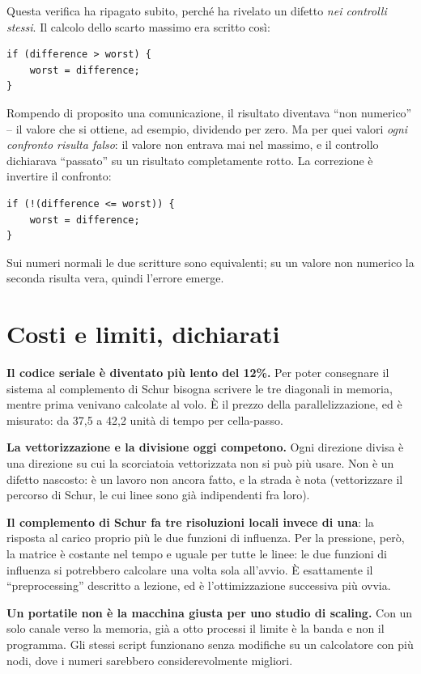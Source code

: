 \documentclass[11pt,a4paper]{article}
\begin{document}
Questa verifica ha ripagato subito, perché ha rivelato un difetto \emph{nei
controlli stessi}. Il calcolo dello scarto massimo era scritto così:

\begin{lstlisting}
if (difference > worst) {
    worst = difference;
}
\end{lstlisting}

Rompendo di proposito una comunicazione, il risultato diventava ``non
numerico'' -- il valore che si ottiene, ad esempio, dividendo per zero. Ma per
quei valori \emph{ogni confronto risulta falso}: il valore non entrava mai nel
massimo, e il controllo dichiarava ``passato'' su un risultato completamente
rotto. La correzione è invertire il confronto:

\begin{lstlisting}
if (!(difference <= worst)) {
    worst = difference;
}
\end{lstlisting}

Sui numeri normali le due scritture sono equivalenti; su un valore non numerico
la seconda risulta vera, quindi l'errore emerge.

\section{Costi e limiti, dichiarati}

\textbf{Il codice seriale è diventato più lento del 12\%.} Per poter consegnare
il sistema al complemento di Schur bisogna scrivere le tre diagonali in
memoria, mentre prima venivano calcolate al volo. È il prezzo della
parallelizzazione, ed è misurato: da 37{,}5 a 42{,}2 unità di tempo per
cella-passo.

\textbf{La vettorizzazione e la divisione oggi competono.} Ogni direzione
divisa è una direzione su cui la scorciatoia vettorizzata non si può più usare.
Non è un difetto nascosto: è un lavoro non ancora fatto, e la strada è nota
(vettorizzare il percorso di Schur, le cui linee sono già indipendenti fra
loro).

\textbf{Il complemento di Schur fa tre risoluzioni locali invece di una}: la
risposta al carico proprio più le due funzioni di influenza. Per la pressione,
però, la matrice è costante nel tempo e uguale per tutte le linee: le due
funzioni di influenza si potrebbero calcolare una volta sola all'avvio. È
esattamente il ``preprocessing'' descritto a lezione, ed è l'ottimizzazione
successiva più ovvia.

\textbf{Un portatile non è la macchina giusta per uno studio di scaling.} Con
un solo canale verso la memoria, già a otto processi il limite è la banda e non
il programma. Gli stessi script funzionano senza modifiche su un calcolatore
con più nodi, dove i numeri sarebbero considerevolmente migliori.
\end{document}
